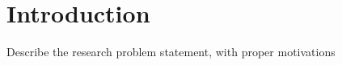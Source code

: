\chapter{Introduction}
\label{chap:introduction}
Describe the research problem statement, with proper motivations

\cite{Turing1936}